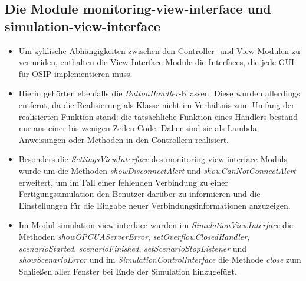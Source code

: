\documentclass[parskip=full]{scrartcl}
\begin{document}
\subsection{Die Module monitoring-view-interface und simulation-view-interface}
\begin{itemize}
 \item Um zyklische Abhängigkeiten zwischen den Controller- und View-Modulen zu vermeiden, enthalten die View-Interface-Module die Interfaces, die jede GUI für OSIP implementieren muss.
 \item Hierin gehörten ebenfalls die \emph{ButtonHandler}-Klassen. Diese wurden allerdings entfernt, da die Realisierung als Klasse nicht im Verhältnis zum Umfang der realisierten Funktion stand: die tatsächliche Funktion eines Handlers bestand nur aus einer bis wenigen Zeilen Code. Daher sind sie als Lambda-Anweisungen oder Methoden in den Controllern realisiert.
 \item Besonders die \emph{SettingsViewInterface} des monitoring-view-interface Moduls wurde um die Methoden \emph{showDisconnectAlert} und \emph{showCanNotConnectAlert} erweitert, um im Fall einer fehlenden Verbindung zu einer Fertigungssimulation den Benutzer darüber zu informieren und die Einstellungen für die Eingabe neuer Verbindungsinformationen anzuzeigen.
 \item Im Modul simulation-view-interface wurden im \emph{SimulationViewInterface} die Methoden \emph{showOPCUAServerError}, \emph{setOverflowClosedHandler}, \emph{scenarioStarted}, \emph{scenarioFinished}, \emph{setScenarioStopListener} und \emph{showScenarioError} und im \emph{SimulationControlInterface} die Methode \emph{close} zum Schließen aller Fenster bei Ende der Simulation hinzugefügt.
\end{itemize}
\end{document}
